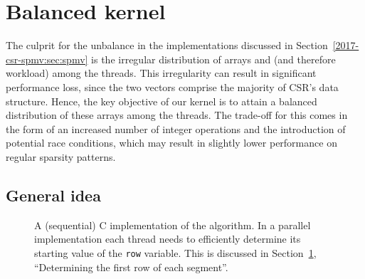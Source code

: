 \section{Balanced \spmv kernel}
\label{2017-csr-spmv:sec:kernel}

The culprit for the unbalance in the \spmv implementations
discussed in Section~\ref{2017-csr-spmv:sec:spmv}
is the irregular distribution of arrays \val and \colidx
(and therefore workload) among the threads.
This irregularity can result in significant performance loss,
since the two vectors comprise the majority of CSR's data structure.
Hence, the key objective of our kernel is to attain a balanced distribution of
these arrays among the threads.
The trade-off for this comes in the form of an increased number
of integer operations and the introduction of potential race conditions,
which may result in slightly lower performance on regular sparsity patterns.

\subsection{General idea}

\begin{figure}[t]
\begin{minipage}{\columnwidth}

\end{minipage}
\caption[A (sequential) C implementation of the \bcsr algorithm]
    {A (sequential) C implementation of the \bcsr algorithm.
        In a parallel implementation each thread needs to
        efficiently determine its starting value of the \texttt{row} variable.
        This is discussed in Section~\ref{2017-csr-spmv:sec:kernel}, ``Determining the first
        row of each segment''.}
\label{2017-csr-spmv:fig:spmvi}
\end{figure}

